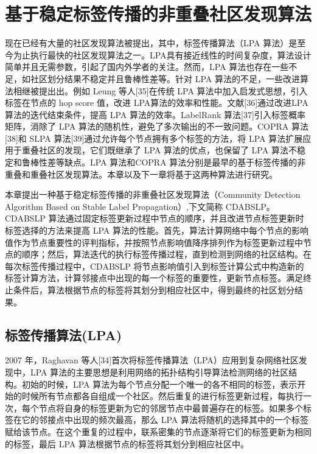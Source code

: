 \chapter{基于稳定标签传播的非重叠社区发现算法}

现在已经有大量的社区发现算法被提出，其中，标签传播算法（LPA 算法）是至今为止执行最快的社区发现算法之一。LPA具有接近线性的时间复杂度，算法设计简单并且无需参数，引起了国内外学者的关注。然而，LPA 算法也存在一些不足，如社区划分结果不稳定并且鲁棒性差等。针对 LPA 算法的不足，一些改进算法相继被提出出。例如 Leung 等人[35]在传统 LPA 算法中加入启发式思想，引入标签在节点的 hop score 值，改进 LPA算法的效率和性能。文献[36]通过改进LPA 算法的迭代结束条件，提高 LPA 算法的效率。LabelRank 算法[37]引入标签概率矩阵，消除了 LPA 算法的随机性，避免了多次输出的不一致问题。COPRA 算法[38]和 SLPA 算法[39]通过允许每个节点拥有多个标签的方法，将 LPA 算法扩展应用于重叠社区的发现，它们既继承了 LPA 算法的优点，也保留了 LPA 算法不稳定和鲁棒性差等缺点。LPA 算法和COPRA 算法分别是最早的基于标签传播的非重叠和重叠社区发现算法。本章以及下一章将基于这两种算法进行研究。

本章提出一种基于稳定标签传播的非重叠社区发现算法（Community Detection Algorithm Based on Stable Label Propagation）,下文简称 CDABSLP。CDABSLP 算法通过固定标签更新过程中节点的顺序，并且改进节点标签更新时标签选择的方法来提高 LPA 算法的性能。首先，算法计算网络中每个节点的影响值作为节点重要性的评判指标，并按照节点影响值降序排列作为标签更新过程中节点的顺序；然后，算法迭代的执行标签传播过程，直到检测到网络的社区结构。在每次标签传播过程中，CDABSLP 将节点影响值引入到标签计算公式中构造新的标签计算方法，计算邻接点中出现的每一个标签的重要性，更新节点标签。满足终止条件后，算法根据节点的标签将其划分到相应社区中，得到最终的社区划分结果。

\section{标签传播算法(LPA)}

2007 年，Raghavan 等人[34]首次将标签传播算法（LPA）应用到复杂网络社区发现中，LPA 算法的主要思想是利用网络的拓扑结构引导算法检测网络的社区结构。初始的时候，LPA 算法为每个节点分配一个唯一的各不相同的标签，表示开始的时候所有节点都各自组成一个社区。然后重复的进行标签更新过程，每执行一次，每个节点将自身的标签更新为它的邻居节点中最普遍存在的标签。如果多个标签在它的邻接点中出现的频次最高，那么 LPA 算法将随机的选择其中的一个标签赋给该节点。在这个重复的过程中，联系密集的节点逐渐将它们的标签更新为相同的标签，最后 LPA 算法根据节点的标签将其划分到相应社区中。

